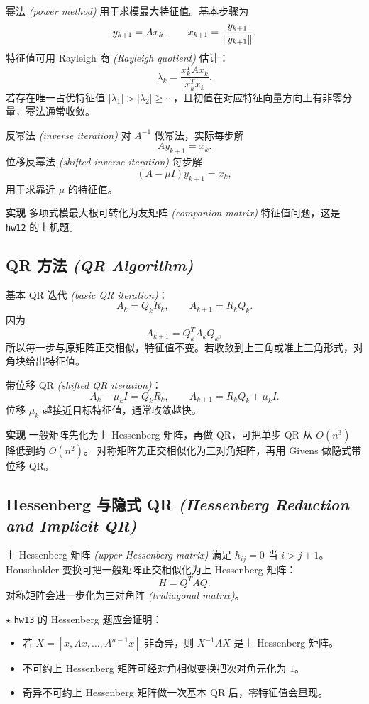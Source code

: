 \documentclass{article}
\newcommand{\keypoint}{\textcolor{red!65!black}{\textbf{$\star$}}}
\newcommand{\impl}{\textcolor{blue!65!black}{\textbf{实现}}}
\newcommand{\eng}[1]{\texorpdfstring{{\normalfont\rmfamily\itshape\textcolor{blue!65!black}{(#1)}}}{(#1)}}
\begin{document}
幂法 \eng{power method} 用于求模最大特征值。基本步骤为
\[
  y_{k+1}=Ax_k,\qquad x_{k+1}=\frac{y_{k+1}}{\left\| y_{k+1} \right\|}.
\]
特征值可用 Rayleigh 商 \eng{Rayleigh quotient} 估计：
\[
  \lambda_k=\frac{x_k^TAx_k}{x_k^Tx_k}.
\]
若存在唯一占优特征值 $|\lambda_1|>|\lambda_2|\ge\cdots$，且初值在对应特征向量方向上有非零分量，幂法通常收敛。

反幂法 \eng{inverse iteration} 对 $A^{-1}$ 做幂法，实际每步解
\[
  Ay_{k+1}=x_k.
\]
位移反幂法 \eng{shifted inverse iteration} 每步解
\[
  (A-\mu I)y_{k+1}=x_k,
\]
用于求靠近 $\mu$ 的特征值。

\impl{} 多项式模最大根可转化为友矩阵 \eng{companion matrix} 特征值问题，这是 \texttt{hw12} 的上机题。

\subsection{QR 方法 \eng{QR Algorithm}}

基本 QR 迭代 \eng{basic QR iteration}：
\[
  A_k=Q_kR_k,\qquad A_{k+1}=R_kQ_k.
\]
因为
\[
  A_{k+1}=Q_k^TA_kQ_k,
\]
所以每一步与原矩阵正交相似，特征值不变。若收敛到上三角或准上三角形式，对角块给出特征值。

带位移 QR \eng{shifted QR iteration}：
\[
  A_k-\mu_k I=Q_kR_k,\qquad A_{k+1}=R_kQ_k+\mu_k I.
\]
位移 $\mu_k$ 越接近目标特征值，通常收敛越快。

\impl{} 一般矩阵先化为上 Hessenberg 矩阵，再做 QR，可把单步 QR 从 $O(n^3)$ 降低到约 $O(n^2)$。
对称矩阵先正交相似化为三对角矩阵，再用 Givens 做隐式带位移 QR。

\subsection{Hessenberg 与隐式 QR \eng{Hessenberg Reduction and Implicit QR}}

上 Hessenberg 矩阵 \eng{upper Hessenberg matrix} 满足 $h_{ij}=0$ 当 $i>j+1$。
Householder 变换可把一般矩阵正交相似化为上 Hessenberg 矩阵：
\[
  H=Q^TAQ.
\]
对称矩阵会进一步化为三对角阵 \eng{tridiagonal matrix}。

\keypoint{} \texttt{hw13} 的 Hessenberg 题应会证明：
\begin{itemize}
  \item 若 $X=[x,Ax,\dots,A^{n-1}x]$ 非奇异，则 $X^{-1}AX$ 是上 Hessenberg 矩阵。
  \item 不可约上 Hessenberg 矩阵可经对角相似变换把次对角元化为 $1$。
  \item 奇异不可约上 Hessenberg 矩阵做一次基本 QR 后，零特征值会显现。
\end{itemize}
\end{document}
